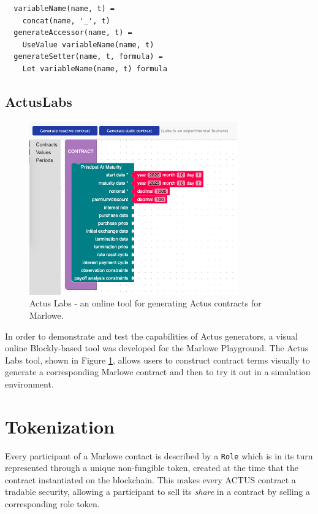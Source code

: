\documentclass[runningheads]{llncs}
\begin{document}
\begin{verbatim}
  variableName(name, t) = 
    concat(name, '_', t) 
  generateAccessor(name, t) = 
    UseValue variableName(name, t) 
  generateSetter(name, t, formula) = 
    Let variableName(name, t) formula 
\end{verbatim}


\subsection{ActusLabs}

\begin{figure}[t]
\includegraphics[width=0.8\textwidth]{images/labs.png}
\caption{Actus Labs - an online tool for generating Actus contracts for Marlowe.} 
\label{fig3} 
\end{figure} 

In order to demonstrate and test the capabilities of Actus generators,
a visual online Blockly-based tool was developed for the Marlowe Playground.
The Actus Labs tool, shown in Figure \ref{fig3}, allows users to construct contract terms visually
to generate a corresponding Marlowe contract and then to try it out in a simulation 
environment.

\section{Tokenization}
\label{tokenization}

Every participant of a Marlowe contact %
is described by a \texttt{Role} which
is in its turn represented through a unique non-fungible token, created at the time that the contract instantiated on the blockchain.
This makes every ACTUS contract a tradable security, allowing a
participant to sell its \emph{share} in a contract by selling a corresponding
role token.
\end{document}
